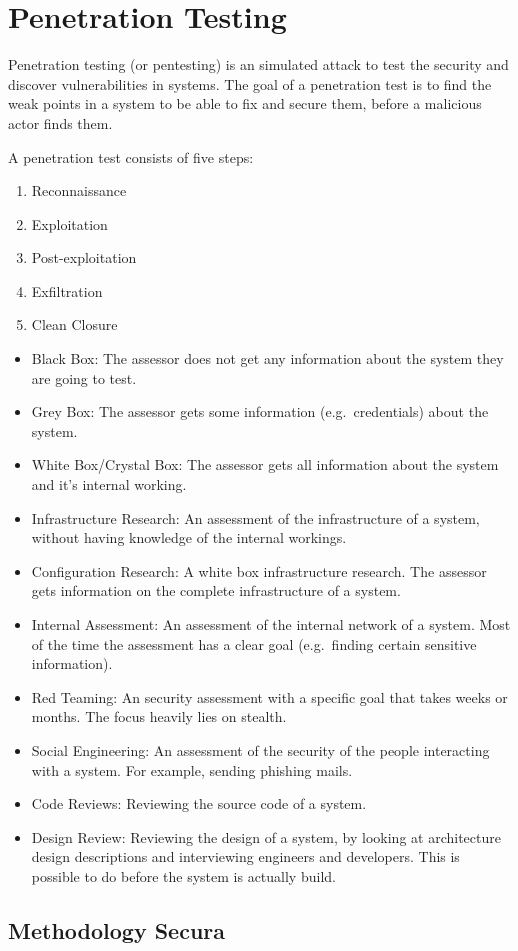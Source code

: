 \section{Penetration Testing}
Penetration testing (or pentesting) is an simulated attack to test the security and discover vulnerabilities in systems. The goal of a penetration test is to find the weak points in a system to be able to fix and secure them, before a malicious actor finds them.

\hfill

A penetration test consists of five steps:
\begin{enumerate}
    \item Reconnaissance
    \item Exploitation
    \item Post-exploitation
    \item Exfiltration
    \item Clean Closure
\end{enumerate}

\begin{itemize}
    \item Black Box: The assessor does not get any information about the system they are going to test.
    \item Grey Box: The assessor gets some information (e.g.\ credentials) about the system.
    \item White Box/Crystal Box:  The assessor gets all information about the system and it's internal working.
    \item Infrastructure Research: An assessment of the infrastructure of a system, without having knowledge of the internal workings.
    \item Configuration Research: A white box infrastructure research. The assessor gets information on the complete infrastructure of a system.
    \item Internal Assessment: An assessment of the internal network of a system. Most of the time the assessment has a clear goal (e.g.\ finding certain sensitive information).
    \item Red Teaming: An security assessment with a specific goal that takes weeks or months. The focus heavily lies on stealth.
    \item Social Engineering: An assessment of the security of the people interacting with a system. For example, sending phishing mails.
    \item Code Reviews: Reviewing the source code of a system.
    \item Design Review: Reviewing the design of a system, by looking at architecture design descriptions and interviewing engineers and developers. This is possible to do before the system is actually build.
\end{itemize}

\subsection{Methodology Secura}
